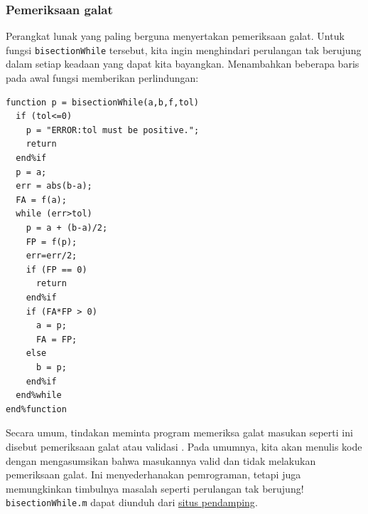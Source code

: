 \subsubsection{Pemeriksaan galat}

Perangkat lunak yang paling berguna menyertakan pemeriksaan galat.
Untuk fungsi \texttt{bisectionWhile} tersebut, kita ingin menghindari
perulangan tak berujung dalam setiap keadaan yang dapat kita bayangkan.
Menambahkan beberapa baris pada awal fungsi memberikan perlindungan:
\begin{verbatim}
function p = bisectionWhile(a,b,f,tol)
  if (tol<=0)
    p = "ERROR:tol must be positive.";
    return
  end%if
  p = a;
  err = abs(b-a);
  FA = f(a);
  while (err>tol)
    p = a + (b-a)/2;
    FP = f(p);
    err=err/2;
    if (FP == 0)
      return
    end%if
    if (FA*FP > 0)
      a = p;
      FA = FP;
    else
      b = p;
    end%if
  end%while
end%function 
\end{verbatim}

Secara umum, tindakan meminta program memeriksa galat masukan seperti
ini disebut pemeriksaan galat  atau validasi
. Pada umumnya, kita akan menulis kode dengan mengasumsikan
bahwa masukannya valid dan tidak melakukan pemeriksaan galat. Ini
menyederhanakan pemrograman, tetapi juga memungkinkan timbulnya masalah
seperti perulangan tak berujung! \texttt{bisectionWhile.m} dapat diunduh
dari \href{http://lqbrin.github.io/tea-time-numerical/ancillaries.html}{situs pendamping}.

\startexercises 

